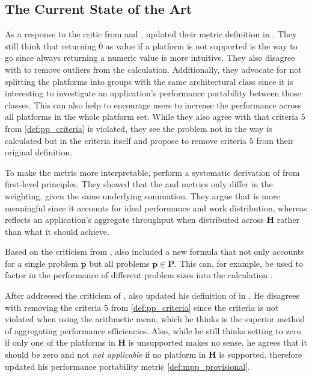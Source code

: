 \subsection{The Current State of the Art}
\label{sec:pp_sota}

As a response to the critic from \citet{yokota_beginners_2018} and \citet{marowka_toward_2021, marowka_reformulation_2022}, \citet{pennycook_revisiting_2021} updated their \pp metric definition in \citeyear{pennycook_revisiting_2021}. 
They still think that returning $0$ as \pp value if a platform is not supported is the way to go since always returning a numeric value is more intuitive. 
They also disagree with \cite{marowka_toward_2021, marowka_reformulation_2022} to remove outliers from the \pp calculation. 
Additionally, they advocate for not splitting the platforms into groups with the same architectural class since it is interesting to investigate an application's performance portability between those classes. 
This can also help to encourage users to increase the performance across all platforms in the whole platform set. 
While they also agree with \cite{marowka_toward_2021, marowka_reformulation_2022} that criteria $5$ from \autoref{def:pp_criteria} is violated, they see the problem not in the way \pp is calculated but in the criteria itself and propose to remove criteria $5$ from their original definition. 

To make the \pp metric more interpretable, \citet{pennycook_revisiting_2021} perform a systematic derivation of \pp from first-level principles. 
They showed that the \pp and \mpp metrics only differ in the weighting, given the same underlying summation. 
They argue that \pp is more meaningful since it accounts for ideal performance and work distribution, whereas \mpp reflects an application's aggregate throughput when distributed across $\mathbf{H}$ rather than what it should achieve. 

Based on the criticism from \citet{yokota_beginners_2018},  \citet{pennycook_revisiting_2021} also included a new \pp formula that not only accounts for a single problem $\mathbf{p}$ but all problems $\mathbf{p} \in \mathbf{P}$. 
This can, for example, be used to factor in the performance of different problem sizes into the calculation \pp.


After \citet{pennycook_revisiting_2021} addressed the criticism of \cite{marowka_toward_2021, marowka_reformulation_2022}, \cite{marowka_comparison_2023} also updated his definition of \mpp in \citeyear{marowka_comparison_2023}. 
He disagrees with removing the criteria $5$ from \autoref{def:pp_criteria} since the criteria is not violated when using the arithmetic mean, which he thinks is the superior method of aggregating performance efficiencies. 
Also, while he still thinks setting \pp to zero if only one of the platforms in $\mathbf{H}$ is unsupported makes no sense, he agrees that it should be zero and not \textit{not applicable} if no platform in $\mathbf{H}$ is supported. 
\citeauthor{marowka_comparison_2023} therefore updated his performance portability metric \autoref{def:mpp_provisional}.

